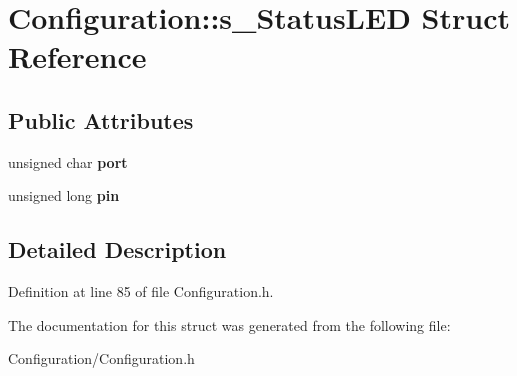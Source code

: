 \section{Configuration\+:\+:s\+\_\+\+Status\+L\+E\+D Struct Reference}
\label{struct_configuration_1_1s___status_l_e_d}
\subsection*{Public Attributes}
\begin{DoxyCompactItemize}
\item 
unsigned char {\bfseries port}\label{struct_configuration_1_1s___status_l_e_d_a3c6ba203469fb47e7e5392cac2544f40}

\item 
unsigned long {\bfseries pin}\label{struct_configuration_1_1s___status_l_e_d_a9b98388d6e537d01ce8b4edb57cc077c}

\end{DoxyCompactItemize}


\subsection{Detailed Description}


Definition at line 85 of file Configuration.\+h.



The documentation for this struct was generated from the following file\+:\begin{DoxyCompactItemize}
\item 
Configuration/Configuration.\+h\end{DoxyCompactItemize}
